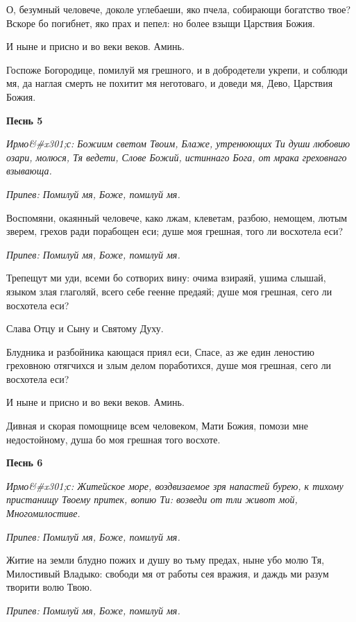 О, безумный человече, доколе углебаеши, яко пчела, собирающи богатство твое? Вскоре бо погибнет, яко прах и пепел: но более взыщи Царствия Божия.


И ныне и присно и во веки веков. Аминь.


Госпоже Богородице, помилуй мя грешного, и в добродетели укрепи, и соблюди мя, да наглая смерть не похитит мя неготоваго, и доведи мя, Дево, Царствия Божия.




\bfseries Песнь 5\normalfont{}


\itshape Ирмо&#x301;с:\normalfont{} Божиим светом Твоим, Блаже, утренюющих Ти души любовию озари, молюся, Тя ведети, Слове Божий, истиннаго Бога, от мрака греховнаго взывающа.


\itshape Припев:\normalfont{} Помилуй мя, Боже, помилуй мя.


Воспомяни, окаянный человече, како лжам, клеветам, разбою, немощем, лютым зверем, грехов ради порабощен еси; душе моя грешная, того ли восхотела еси?


\itshape Припев:\normalfont{} Помилуй мя, Боже, помилуй мя.


Трепещут ми уди, всеми бо сотворих вину: очима взираяй, ушима слышай, языком злая глаголяй, всего себе геенне предаяй; душе моя грешная, сего ли восхотела еси?


Слава Отцу и Сыну и Святому Духу.


Блудника и разбойника кающася приял еси, Спасе, аз же един леностию греховною отягчихся и злым делом поработихся, душе моя грешная, сего ли восхотела еси?


И ныне и присно и во веки веков. Аминь.


Дивная и скорая помощнице всем человеком, Мати Божия, помози мне недостойному, душа бо моя грешная того восхоте.




\bfseries Песнь 6\normalfont{}


\itshape Ирмо&#x301;с:\normalfont{} Житейское море, воздвизаемое зря напастей бурею, к тихому пристанищу Твоему притек, вопию Ти: возведи от тли живот мой, Многомилостиве.


\itshape Припев:\normalfont{} Помилуй мя, Боже, помилуй мя.


Житие на земли блудно пожих и душу во тьму предах, ныне убо молю Тя, Милостивый Владыко: свободи мя от работы сея вражия, и даждь ми разум творити волю Твою.


\itshape Припев:\normalfont{} Помилуй мя, Боже, помилуй мя.


